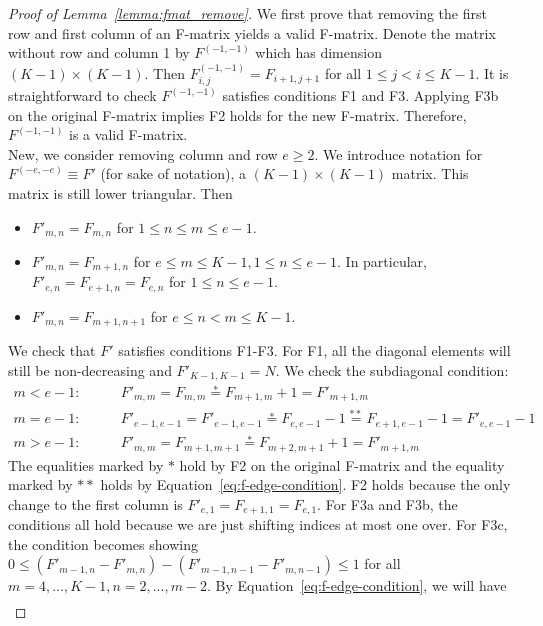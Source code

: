 \documentclass{article}
\begin{document}
\begin{proof}[Proof of Lemma~\ref{lemma:fmat_remove}]
We first prove that removing the first row and first column of an F-matrix yields a valid F-matrix. Denote the matrix without row and column 1 by $F^{(-1, -1)}$ which has dimension $(K-1) \times (K-1)$. Then $F^{(-1,-1)}_{i,j} = F_{i+1, j+1}$ for all $1\leq j <i \leq K-1$. It is straightforward to check $F^{(-1,-1)}$ satisfies conditions F1 and F3. Applying F3b on the original F-matrix implies F2 holds for the new F-matrix. Therefore, $F^{(-1,-1)}$ is a valid F-matrix. \\ 

\noindent New, we consider removing column and row $e\geq 2$. We introduce notation for $F^{(-e, -e)}\equiv F'$ (for sake of notation), a $(K-1) \times (K-1)$ matrix. This matrix is still lower triangular. Then
\begin{itemize}
    \item $F'_{m,n} = F_{m,n}$ for $1 \leq n \leq m \leq e-1$.
    \item $F'_{m,n} = F_{m+1, n}$ for $e \leq m \leq K-1, 1 \leq n \leq e-1$. In particular, $F'_{e, n} = F_{e+1, n} = F_{e, n}$ for $1 \leq n \leq e-1$. 
    \item $F'_{m,n} = F_{m+1, n+1}$ for $e \leq n <m \leq K-1$. 
\end{itemize}
We check that $F'$ satisfies conditions F1-F3. For F1, all the diagonal elements will still be non-decreasing and $F'_{K-1, K-1}=N$. We check the subdiagonal condition: 
\begin{align*}
    m< e-1: \qquad & F'_{m,m} = F_{m,m} \stackrel{*}{=} F_{m+1, m} + 1 = F'_{m+1,m}\\
    m = e-1: \qquad & F'_{e-1, e-1} = F'_{e-1, e-1} \stackrel{*}{=} F_{e, e-1} - 1 \stackrel{**}{=}F_{e+1, e-1} -1 = F'_{e, e-1}-1    \\
    m> e-1: \qquad & F'_{m,m} = F_{m+1,m+1} \stackrel{*}{=} F_{m+2, m+1} + 1 = F'_{m+1,m} 
\end{align*}
The equalities marked by $*$ hold by F2 on the original F-matrix and the equality marked by $**$ holds by Equation~\ref{eq:f-edge-condition}. F2 holds because the only change to the first column is $F'_{e, 1} = F_{e+1, 1} = F_{e, 1}$. For F3a and F3b, the conditions all hold because we are just shifting indices at most one over. For F3c, the condition becomes showing $0\leq (F'_{m-1, n} - F'_{m,n}) - (F'_{m-1, n-1}- F'_{m,n-1}) \leq 1$ for all $m=4,...,K-1, n=2,...,m-2$. By Equation~\ref{eq:f-edge-condition}, we will have 
\begin{align*}

\end{align*}
\end{proof}
\end{document}
